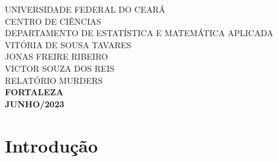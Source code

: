 \documentclass[12pt]{article}
\begin{document}
\thispagestyle{empty}

\begin{center}
UNIVERSIDADE FEDERAL DO CEARÁ \\
CENTRO DE CIÊNCIAS \\
DEPARTAMENTO DE ESTATÍSTICA E MATEMÁTICA APLICADA \\
\vspace{4cm}
VITÓRIA DE SOUSA TAVARES \\
JONAS FREIRE RIBEIRO \\
VICTOR SOUZA DOS REIS\\
\vspace{6cm}
RELATÓRIO MURDERS \\
\vspace{10cm}
\textbf{FORTALEZA \\
JUNHO/2023}
\end{center}

\newpage 
\tableofcontents

\newpage 
\section{Introdução}
\end{document}
